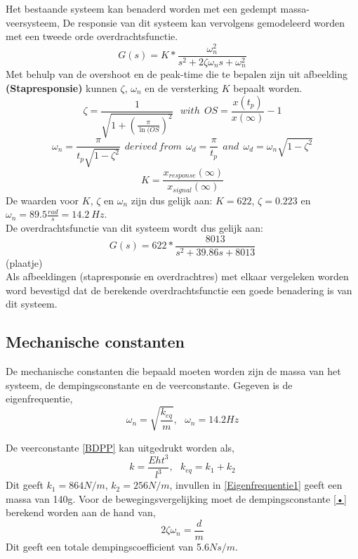 \documentclass[a4paper]{article}
\begin{document}
Het bestaande systeem kan benaderd worden met een gedempt massa-veersysteem, De responsie van dit systeem kan vervolgens gemodeleerd worden met een tweede orde overdrachtsfunctie. 
\begin{equation}
G(s) = K * \frac{\omega_n^2}{s^2 + 2 \zeta \omega_n s + \omega_n^2}
\end{equation}
Met behulp van de overshoot en de peak-time die te bepalen zijn uit afbeelding \textbf{(Stapresponsie)} kunnen $\zeta$, $\omega_n$ en de versterking $K$ bepaalt worden.
\begin{equation}
\zeta = \frac{1}{\sqrt{1 + (\frac{\pi}{\ln(OS})^2}} \ \ \ with \ \ OS = \frac{x(t_p)}{x(\infty)} -1
\end{equation}
\begin{equation}
\omega_n = \frac{\pi}{t_p \sqrt{1 - \zeta^2}} \ \ derived \ from \ \ \omega_d = \frac{\pi}{t_p} \ \ and \ \ \omega_d = \omega_n \sqrt{1-\zeta^2}
\end{equation}
\begin{equation}
K = \frac{x_{response}(\infty)}{x_{signal}(\infty)}
\end{equation}
De waarden voor $K$, $\zeta$ en $\omega_n$ zijn dus gelijk aan: $ K = 622$, 
$\zeta = 0.223$ en $\omega_n = 89.5 \frac{rad}{s} = 14.2 \ Hz$.\\
De overdrachtsfunctie van dit systeem wordt dus gelijk aan:
\begin{equation}
G(s) = 622 * \frac{8013}{s^2 + 39.86 s + 8013}
\end{equation}
(plaatje) \\
Als afbeeldingen (stapresponsie en overdrachtres) met elkaar vergeleken worden word bevestigd dat de berekende overdrachtsfunctie een goede benadering is van dit systeem. 

\subsection{Mechanische constanten}

De mechanische constanten die bepaald moeten worden zijn de massa van het systeem, de dempingsconstante en de veerconstante. Gegeven is de eigenfrequentie,\\ 

\begin{equation}
\omega_n=\sqrt{\frac{k_{eq}}{m}}, \ \ \ \omega_n=14.2Hz
\label{Eigenfrequentie1}
\end{equation}

De veerconstante \ref{BDPP} kan uitgedrukt worden als,
\begin{equation}
k=\frac{Eht^3}{l^3}, \ \ \ k_{eq}=k_1+k_2
\label{Veerstijfheid} 
\end{equation} 
Dit geeft $k_1=864$$N/m$, $k_2=256$$N/m$, invullen in \ref{Eigenfrequentie1} geeft een massa van 140g. Voor de bewegingsvergelijking moet de dempingsconstante \ref{•} berekend worden aan de hand van,
\begin{equation}
2\zeta\omega_n=\frac{d}{m}
\end{equation} 
Dit geeft een totale dempingscoefficient van 5.6$Ns/m$.\\
\end{document}
